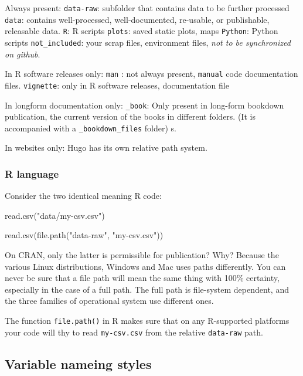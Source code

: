 \documentclass[
  fontsize=13pt,
  english,
  a4paper,
  openany, a4paper, oneside]{book}
\newenvironment{Shaded}{\begin{snugshade}}{\end{snugshade}}
\newcommand{\FunctionTok}[1]{\textcolor[rgb]{0.00,0.00,0.00}{#1}}
\newcommand{\NormalTok}[1]{#1}
\newcommand{\StringTok}[1]{\textcolor[rgb]{0.31,0.60,0.02}{#1}}
\begin{document}
Always present:
\texttt{data-raw}: subfolder that contains data to be further processed
\texttt{data}: contains well-processed, well-documented, re-usable, or publishable, releasable data.
\texttt{R}: R scripts
\texttt{plots}: saved static plots, maps
\texttt{Python}: Python scripts
\texttt{not\_included}: your scrap files, environment files, \emph{not to be synchronized on github}.

In R software releases only:
\texttt{man} : not always present, \texttt{manual} code documentation files.
\texttt{vignette}: only in R software releases, documentation file

In longform documentation only:
\texttt{\_book}: Only present in long-form bookdown publication, the current version of the books in different folders. (It is accompanied with a \texttt{\_bookdown\_files} folder)
s.

In websites only:
Hugo has its own relative path system.

\hypertarget{R-guide}{%
\subsubsection{R language}\label{R-guide}}

Consider the two identical meaning R code:

\begin{Shaded}
\begin{Highlighting}[]
\FunctionTok{read.csv}\NormalTok{(}\StringTok{"data/my{-}csv.csv"}\NormalTok{)}

\FunctionTok{read.csv}\NormalTok{(}\FunctionTok{file.path}\NormalTok{(}\StringTok{"data{-}raw"}\NormalTok{, }\StringTok{"my{-}csv.csv"}\NormalTok{))}
\end{Highlighting}
\end{Shaded}

On CRAN, only the latter is permissible for publication? Why? Because the various Linux distributions, Windows and Mac uses paths differently. You can never be sure that a file path will mean the same thing with 100\% certainty, especially in the case of a full path. The full path is file-system dependent, and the three families of operational system use different ones.

The function \texttt{file.path()} in R makes sure that on any R-supported platforms your code will thy to read \texttt{my-csv.csv} from the relative \texttt{data-raw} path.

\hypertarget{variable-nameing-styles}{%
\subsection{Variable nameing styles}\label{variable-nameing-styles}}
\end{document}
